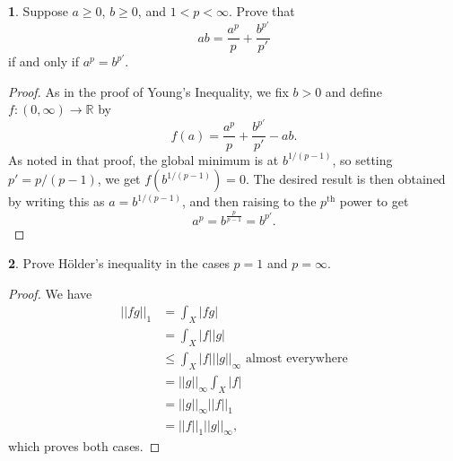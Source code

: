 \documentclass[12pt]{article}
\theoremstyle{definition}
\newtheorem{ex}{}
\newenvironment{exercise}[1]{
	\renewcommand{\theex}{#1}
	\begin{ex}
		}{\end{ex}}
\begin{document}
\begin{exercise}{7A.2}
	Suppose $a \geq 0$, $b \geq 0$, and $1 < p < \infty$.
	Prove that \begin{equation*}
		ab = \frac{a^p}{p} + \frac{b^{p'}}{p'}
	\end{equation*}
	if and only if $a^p = b^{p'}$.
\end{exercise}
\begin{proof}
	As in the proof of Young's Inequality, we fix $b > 0$ and define $f : (0, \infty) \to \mathbb{R}$ by \begin{equation*}
		f(a) = \frac{a^p}{p} + \frac{b^{p'}}{p'} - ab.
	\end{equation*}
	As noted in that proof, the global minimum is at $b^{1/(p-1)}$, so setting $p' = p/(p-1)$, we get $f(b^{1/(p-1)}) = 0$.
  The desired result is then obtained by writing this as $a = b^{1/(p-1)}$, and then raising to the $p^\text{th}$ power to get \begin{equation*}
    a^p = b^{\frac{p}{p-1}} = b^{p'}.
  \end{equation*}
\end{proof}

\begin{exercise}{7A.4}
	Prove Hölder's inequality in the cases $p = 1$ and $p = \infty$.
\end{exercise}
\begin{proof}
	We have \begin{align*}
		||fg||_1 & = \int_X |fg|                                          \\
		         & = \int_X |f||g|                                        \\
		         & \leq \int_X |f| ||g||_\infty \text{ almost everywhere} \\
		         & = ||g||_\infty \int_X |f|                              \\
		         & = ||g||_\infty ||f||_1                                 \\
		         & = ||f||_1 ||g||_\infty,
	\end{align*}
	which proves both cases.
\end{proof}
\end{document}
